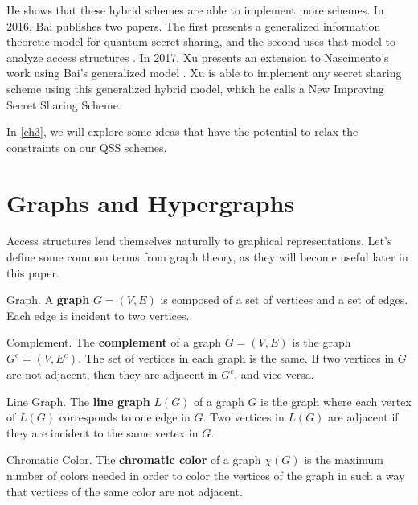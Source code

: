 He shows that these hybrid schemes are able to implement more schemes. In 2016, Bai publishes two papers. The first presents a generalized information theoretic model for quantum secret sharing, and the second uses that model to analyze access structures \cite{bai_generalized_2016} \cite{bai_quantum_2017}. In 2017, Xu presents an extension to Nascimento's work using Bai's generalized model \cite{xu_new_2017}. Xu is able to implement any secret sharing scheme using this generalized hybrid model, which he calls a New Improving Secret Sharing Scheme. 

In \cref{ch3}, we will explore some ideas that have the potential to relax the constraints on our QSS schemes. 

 
\section{Graphs and Hypergraphs}

Access structures lend themselves naturally to graphical representations. Let's define some common terms from graph theory, as they will become useful later in this paper. 

\begin{definition}{Graph.}
    \label{defn:graph}
    A \textbf{graph} $G=(V,E)$ is composed of a set of vertices and a set of edges. Each edge is incident to two vertices.
\end{definition}

\begin{definition}{Complement.}
    \label{defn:complement}
    The \textbf{complement} of a graph $G = (V,E)$ is the graph $G^c = (V,E^c)$. The set of vertices in each graph is the same. If two vertices in $G$ are not adjacent, then they are adjacent in $G^c$, and vice-versa.
\end{definition}

\begin{definition}{Line Graph.}
    \label{defn:line-graph}
    The \textbf{line graph} $L(G)$ of a graph $G$ is the graph where each vertex of $L(G)$ corresponds to one edge in $G$. Two vertices in $L(G)$ are adjacent if they are incident to the same vertex in $G$. 
\end{definition}

\begin{definition}{Chromatic Color.}
    \label{defn:colors}
	The \textbf{chromatic color} of a graph $\chi(G)$ is the maximum number of colors needed in order to color the vertices of the graph in such a way that vertices of the same color are not adjacent.
\end{definition}

